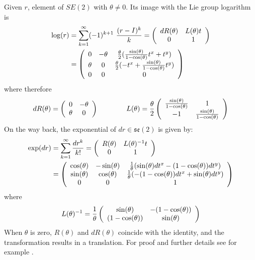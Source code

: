 Given $r$, element of $SE(2)$ with $\theta\neq 0$. Its image with the Lie group logarithm is
\begin{align*}
\log(r)
&=
\sum_{k=1}^{\infty} (-1)^{k+1}~\frac{(r - I)^k}{k}
=
\left (
\begin{array} {c c }
dR(\theta) & L(\theta)t \\
0 & 1 
\end{array}
\right )
\\
&=
\left (
\begin{array} {c c c}
0   & - \theta& \frac{\theta}{2} (\frac{\sin(\theta)}{1-\cos(\theta)} t^x + t^y )\\
\theta & 0     & \frac{\theta}{2} (- t^x + \frac{\sin(\theta)}{1-\cos(\theta)} t^y )\\
0 & 0 &  0
\end{array}
\right )
\end{align*}
where therefore 
\begin{align*}
dR(\theta) = 
\left (
\begin{array} {c c }
0 & -\theta \\
\theta & 0 
\end{array}
\right )
\qquad \qquad 
L(\theta) = 
\frac{\theta}{2}
\left (
\begin{array} {c c }
\frac{\sin(\theta)}{1-\cos(\theta)} & 1 \\
-1 & \frac{\sin(\theta)}{1-\cos(\theta)}
\end{array}
\right )
\end{align*}
On the way back, the exponential of $dr \in \mathfrak{se}(2)$ is given by:
\begin{align*}
\exp(dr)
&=
\sum_{k=1}^{\infty} \frac{dr^{k}}{k!}
=
\left (
\begin{array} {c c }
R(\theta) & L(\theta)^{-1}t \\
0 & 1 
\end{array}
\right )
\\
&=
\left (
\begin{array} {c c c}
\cos(\theta)   & - \sin(\theta)& \frac{1}{\theta} (\sin(\theta)dt^x - (1-\cos(\theta)) dt^y )\\
\sin(\theta) & \cos(\theta)     & \frac{1}{\theta} (- (1-\cos(\theta))dt^x + \sin(\theta) dt^y )\\
0 & 0 &  1
\end{array}
\right )
\end{align*}
where
\begin{align*}
L(\theta)^{-1} = 
\frac{1}{\theta}
\left (
\begin{array} {c c }
\sin(\theta) & -(1-\cos(\theta)) \\
(1-\cos(\theta)) & \sin(\theta)
\end{array}
\right )
\end{align*}
When $\theta$ is zero, $R(\theta)$ and $dR(\theta)$ coincide with the identity, and the transformation results in a translation. For proof and further details see for example \cite{gallier2011geometric} \cite{hall2015lie}.

